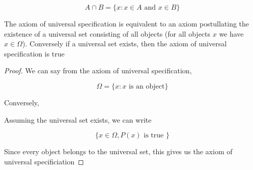 \documentclass[11pt]{report}
\begin{document}
\begin{definition}
	\[A \cap B = \{x: x \in A \text{ and } x \in B \}\]
\end{definition}

\begin{prop}
	The axiom of universal specification is equivalent to an axiom postullating the existence of a universal set consisting of all objects (for all objects $x$ we have $x \in \Omega$). Conversely if a universal set exists, then the axiom of universal specification is true
\end{prop}
\begin{proof}
	We can say from the axiom of universal specification,

	\[
		\Omega = \{ x : x \text{ is an object}\}
	\]

	Conversely,

	Assuming the universal set exists, we can write

	\[
		\{x \in \Omega, P(x) \text{ is true }\}
	\]

	Since every object belongs to the universal set, this gives us the axiom of universal specificiation
\end{proof}
\end{document}
